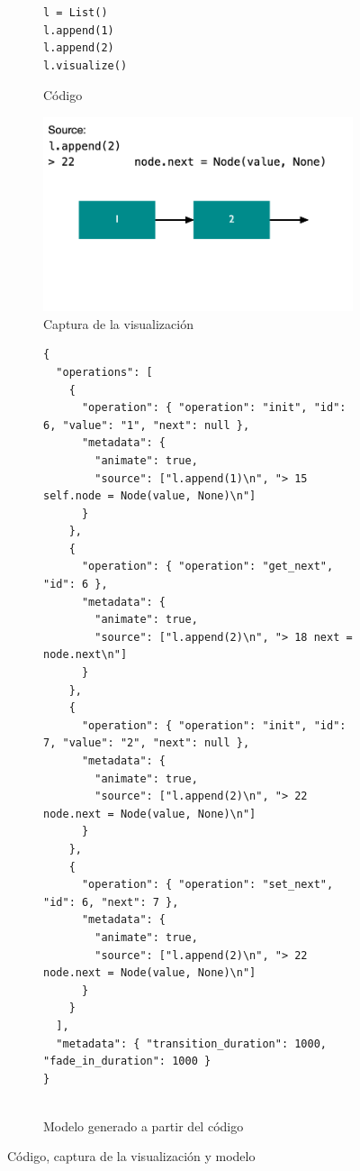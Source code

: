 \begin{figure}[p]
\begin{subfigure}[b]{0.49\textwidth}
\begin{verbatim}
l = List()
l.append(1)
l.append(2)
l.visualize()
        \end{verbatim}
        \caption{Código}
        \label{fig:codigo-vs-modelo:codigo}
    \end{subfigure}
    \hfill
    \begin{subfigure}[b]{0.49\textwidth}
        \centering
        \includegraphics[width=\textwidth]{imagenes/codigo-imagen-modelo.png}
        \caption{Captura de la visualización}
        \label{fig:codigo-vs-modelo:imagen}
    \end{subfigure}
    \begin{subfigure}[b]{0.8\textwidth}
        \centering
        \begin{verbatim}
{
  "operations": [
    {
      "operation": { "operation": "init", "id": 6, "value": "1", "next": null },
      "metadata": {
        "animate": true,
        "source": ["l.append(1)\n", "> 15     self.node = Node(value, None)\n"]
      }
    },
    {
      "operation": { "operation": "get_next", "id": 6 },
      "metadata": {
        "animate": true,
        "source": ["l.append(2)\n", "> 18 next = node.next\n"]
      }
    },
    {
      "operation": { "operation": "init", "id": 7, "value": "2", "next": null },
      "metadata": {
        "animate": true,
        "source": ["l.append(2)\n", "> 22 node.next = Node(value, None)\n"]
      }
    },
    {
      "operation": { "operation": "set_next", "id": 6, "next": 7 },
      "metadata": {
        "animate": true,
        "source": ["l.append(2)\n", "> 22 node.next = Node(value, None)\n"]
      }
    }
  ],
  "metadata": { "transition_duration": 1000, "fade_in_duration": 1000 }
}
                      
        \end{verbatim}
        \caption{Modelo generado a partir del código}
        \label{fig:codigo-vs-modelo:modelo}
    \end{subfigure}
    \caption{Código, captura de la visualización y modelo}
    \label{fig:codigo-vs-modelo}
\end{figure}

